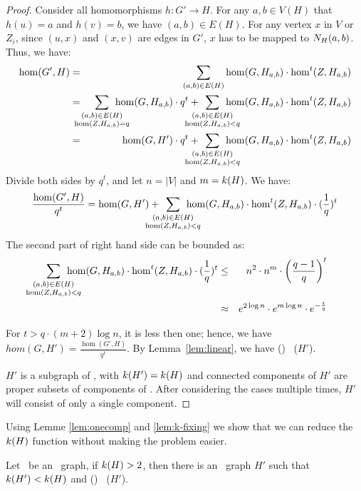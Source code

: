 \begin{proof}
Consider all homomorphisms \(h: G'\to H\)\@.
For any \(a,b\in V(H)\) that \(h(u)=a\) and \(h(v)=b\), we have \((a,b)\in E(H)\)\@.
For any vertex \(x\) in \(V\) or \(Z_i\), since \((u,x)\) and \((x,v)\) are edges in \(G'\), 
\(x\) has to be mapped to \(N_{H}({a},{b})\)\@. Thus, we have:
\begin{eqnarray*}
\hom(G',H) &=&
\sum_{(a,b)\in E(H)} \hom(G,H_{a,b}) \cdot \hom^t(Z, H_{a,b}) \\
&=&
\bigsum{\substack{(a,b)\in E(H)\\ \hom(Z, H_{a,b}) = q}} \hom(G, H_{a,b}) \cdot q^t + 
\bigsum{\substack{(a,b)\in E(H)\\ \hom(Z, H_{a,b}) < q}} 
\hom(G, H_{a,b}) \cdot \hom^t(Z,H_{a,b})\\
&=&
\hom(G,H') \cdot q^t + \bigsum{\substack{(a,b)\in E(H)\\ \hom(Z, H_{a,b}) < q}} 
\hom(G, H_{a,b}) \cdot \hom^t(Z,H_{a,b})
\end{eqnarray*}
Divide both sides by \(q^t\), and let \(n=|V|\) and \(m=k(H)\)\@. We have:
\[
\frac{\hom(G',H)}{q^t} = 
\hom(G,H') + 
\bigsum{\substack{(a,b)\in E(H)\\ \hom(Z, H_{a,b}) < q}} 
\hom(G, H_{a,b}) \cdot \hom^t(Z,H_{a,b}) \cdot (\frac{1}{q})^t
\]
The second part of right hand side can be bounded as:
\begin{eqnarray*}
\bigsum{\substack{(a,b)\in E(H)\\ \hom(Z, H_{a,b}) < q}} 
\hom(G, H_{a,b}) \cdot \hom^t(Z,H_{a,b}) \cdot (\frac{1}{q})^t & \le &
n^2 \cdot n^m \cdot \left(\frac{q-1}{q}\right)^t\\
& \approx & e ^ {2\log n} \cdot e^{m\log n} \cdot e^{-\frac{t}{q}} \\
\end{eqnarray*}

For \(t > q \cdot (m+2)\log n\), it is less then one; hence, we have
\(hom(G,H')=\frac{\hom(G',H)}{q^t}\)\@. By Lemma~\ref{lem:linear},
we have \chom(\mH) \mapge\ \chom(\(H'\)). 

\(H'\) is a subgraph of \mH, with \(k(H')=k(H)\) and connected components of \(H'\)
are proper subsets of components of \mH\@. After considering the cases multiple times,
\(H'\) will consist of only a single component.
\end{proof}

Using Lemme \ref{lem:onecomp} and \ref{lem:k-fixing} we show that we can reduce the 
\(k(H)\) function without making the problem easier.

\begin{lemma} \label{lem:k-reduction}
Let \mH\ be an \RBA\ graph, if \(k(H) > 2\), then
there is an \RBA\ graph \(H'\) such that \(k(H') < k(H)\)
and \chom(\mH) \mapge\ \chom(\(H'\))\@.
\end{lemma}

